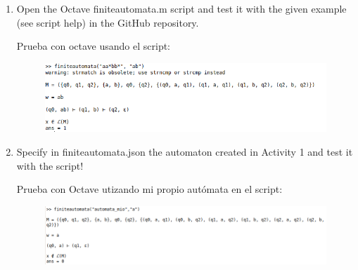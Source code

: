 \documentclass[11pt]{article}
\begin{document}
\begin{enumerate}
\item Open the Octave finiteautomata.m script and test it with the given
example (see script help) in the GitHub repository.

Prueba con octave usando el script:

\begin{figure}[htp]
\centering
\includegraphics[scale=0.65]{images/2a.png}
\end{figure}

\end{enumerate}

\begin{enumerate}
\setcounter{enumi}{1}
\item Specify in finiteautomata.json the automaton created in Activity 1
and test it with the script!

Prueba con Octave utizando mi propio autómata en el script:

\begin{figure}[htp]
\centering
\includegraphics[scale=0.65]{images/2b.png}
\end{figure}

\end{enumerate}
\end{document}

